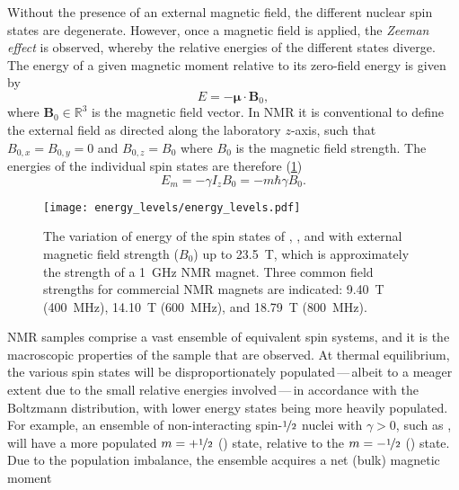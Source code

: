 Without the presence of an external magnetic field, the different nuclear spin
states are degenerate. However, once a magnetic field is applied, the
\emph{Zeeman effect} is observed, whereby the relative energies of the
different states diverge. The energy of a given magnetic moment relative to its
zero-field energy is given by
\begin{equation}
  E = - \symbf{\mu} \cdot \symbf{B}_0,
\end{equation}
where $\symbf{B}_0 \in \mathbb{R}^3$ is the magnetic field vector. In \ac{NMR}
it is conventional to define the external field as directed along the
laboratory $z$-axis, such that $B_{0,x} = B_{0,y} = 0$ and $B_{0,z} = B_0$
where $B_0$ is the magnetic field strength. The energies of the individual spin
states are therefore (\cref{fig:energy_levels})
\begin{equation}
  E_m = - \gamma I_z B_0 = -m \hbar \gamma B_0.
\end{equation}
\begin{figure}%
    \centering%
    \texttt{[image: energy\_levels/energy\_levels.pdf]}%
    \caption[%
        The variation of energy of the spin states of ,
        , and  with external magnetic
        field strength.
    ]{%
        The variation of energy of the spin states of ,
        , and  with external magnetic
        field strength ($B_0$) up to \qty{23.5}{\tesla}, which is
        approximately the strength of a \qty{1}{\giga \hertz} \ac{NMR} magnet.
        Three common field strengths for commercial NMR magnets are indicated:
        \qty{9.40}{\tesla} (\qty{400}{\mega\hertz}), \qty{14.10}{\tesla}
        (\qty{600}{\mega\hertz}), and \qty{18.79}{\tesla}
        (\qty{800}{\mega\hertz}).
    }%
    \label{fig:energy_levels}%
\end{figure}%
\ac{NMR} samples comprise a vast ensemble of equivalent spin systems, and it is
the macroscopic properties of the sample that are observed.
At thermal equilibrium, the various spin states will be disproportionately
populated\,---\,albeit to a meager extent due to the small
relative energies involved\,---\,in accordance with the Boltzmann
distribution, with lower energy states being more heavily populated. For
example, an ensemble of
non-interacting spin-$\nicefrac{1}{2}$ nuclei with $\gamma > 0$, such as
, will have a more populated $m = +\nicefrac{1}{2}$ (\textalpha) state,
relative to the $m = -\nicefrac{1}{2}$ (\textbeta) state.  Due to the
population imbalance, the ensemble acquires a net (bulk) magnetic moment

